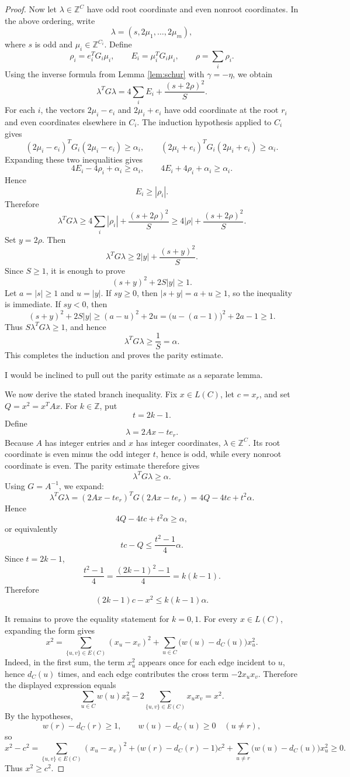 \documentclass[12pt]{article}
\newcommand{\Z}{\mathbb{Z}}
\newcommand{\review}[1]{\begin{reviewbox}#1\end{reviewbox}}
\begin{document}
\begin{proof}
Now let \(\lambda\in\Z^C\) have odd root coordinate and even nonroot coordinates. In the above ordering, write
\[
\lambda=(s,2\mu_1,\dots,2\mu_m),
\]
where \(s\) is odd and \(\mu_i\in\Z^{C_i}\). Define
\[
\rho_i=e_i^TG_i\mu_i,
\qquad
E_i=\mu_i^TG_i\mu_i,
\qquad
\rho=\sum_i\rho_i.
\]
Using the inverse formula from Lemma \ref{lem:schur} with \(\gamma=-\eta\), we obtain
\[
\lambda^TG\lambda
=
4\sum_i E_i+\frac{(s+2\rho)^2}{S}.
\]
For each \(i\), the vectors \(2\mu_i-e_i\) and \(2\mu_i+e_i\) have odd coordinate at the root \(r_i\) and even coordinates elsewhere in \(C_i\). The induction hypothesis applied to \(C_i\) gives
\[
(2\mu_i-e_i)^TG_i(2\mu_i-e_i)\ge \alpha_i,
\qquad
(2\mu_i+e_i)^TG_i(2\mu_i+e_i)\ge \alpha_i.
\]
Expanding these two inequalities gives
\[
4E_i-4\rho_i+\alpha_i\ge \alpha_i,
\qquad
4E_i+4\rho_i+\alpha_i\ge \alpha_i.
\]
Hence
\[
E_i\ge |\rho_i|.
\]
Therefore
\[
\lambda^TG\lambda
\ge
4\sum_i|\rho_i|+\frac{(s+2\rho)^2}{S}
\ge
4|\rho|+\frac{(s+2\rho)^2}{S}.
\]
Set \(y=2\rho\). Then
\[
\lambda^TG\lambda
\ge
2|y|+\frac{(s+y)^2}{S}.
\]
Since \(S\ge 1\), it is enough to prove
\[
(s+y)^2+2S|y|\ge 1.
\]
Let \(a=|s|\ge 1\) and \(u=|y|\). If \(sy\ge 0\), then \(|s+y|=a+u\ge 1\), so the inequality is immediate. If \(sy<0\), then
\[
(s+y)^2+2S|y|
\ge
(a-u)^2+2u
=
\bigl(u-(a-1)\bigr)^2+2a-1
\ge 1.
\]
Thus \(S\lambda^TG\lambda\ge 1\), and hence
\[
\lambda^TG\lambda\ge \frac{1}{S}=\alpha.
\]
This completes the induction and proves the parity estimate.
\review{I would be inclined to pull out the parity estimate as a separate lemma.}
We now derive the stated branch inequality. Fix \(x\in L(C)\), let \(c=x_r\), and set \(Q=x^2=x^TAx\). For \(k\in\Z\), put
\[
t=2k-1.
\]
Define
\[
\lambda=2Ax-te_r.
\]
Because \(A\) has integer entries and \(x\) has integer coordinates, \(\lambda\in\Z^C\). Its root coordinate is even minus the odd integer \(t\), hence is odd, while every nonroot coordinate is even. The parity estimate therefore gives
\[
\lambda^TG\lambda\ge \alpha.
\]
Using \(G=A^{-1}\), we expand:
\[
\lambda^TG\lambda
=
(2Ax-te_r)^TG(2Ax-te_r)
=
4Q-4tc+t^2\alpha.
\]
Hence
\[
4Q-4tc+t^2\alpha\ge \alpha,
\]
or equivalently
\[
tc-Q\le \frac{t^2-1}{4}\alpha.
\]
Since \(t=2k-1\),
\[
\frac{t^2-1}{4}
=
\frac{(2k-1)^2-1}{4}
=
k(k-1).
\]
Therefore
\[
(2k-1)c-x^2\le k(k-1)\alpha.
\]

It remains to prove the equality statement for \(k=0,1\). For every \(x\in L(C)\), expanding the form gives
\[
x^2
=
\sum_{\{u,v\}\in E(C)}(x_u-x_v)^2
+
\sum_{u\in C}\bigl(w(u)-d_C(u)\bigr)x_u^2.
\]
Indeed, in the first sum, the term \(x_u^2\) appears once for each edge incident to \(u\), hence \(d_C(u)\) times, and each edge contributes the cross term \(-2x_ux_v\). Therefore the displayed expression equals
\[
\sum_{u\in C}w(u)x_u^2-2\sum_{\{u,v\}\in E(C)}x_ux_v=x^2.
\]
By the hypotheses,
\[
w(r)-d_C(r)\ge 1,
\qquad
w(u)-d_C(u)\ge 0\quad(u\ne r),
\]
so
\[
x^2-c^2
=
\sum_{\{u,v\}\in E(C)}(x_u-x_v)^2
+
\bigl(w(r)-d_C(r)-1\bigr)c^2
+
\sum_{u\ne r}\bigl(w(u)-d_C(u)\bigr)x_u^2
\ge 0.
\]
Thus \(x^2\ge c^2\).


\end{proof}
\end{document}
